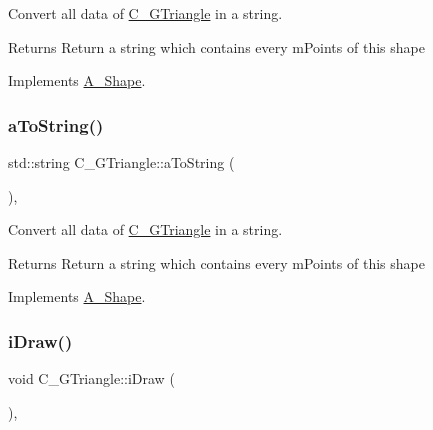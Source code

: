 Convert all data of \hyperlink{classC__GTriangle}{C\+\_\+\+G\+Triangle} in a string. 

\begin{DoxyReturn}{Returns}
Return a string which contains every m\+Points of this shape 
\end{DoxyReturn}


Implements \hyperlink{classA__Shape_ad8804b4e74543db374af6892367b7c2e}{A\+\_\+\+Shape}.

\mbox{\label{classC__GTriangle_aa432e8b8320db8a53ef1d59b486ed7ce}} 
\subsubsection{\texorpdfstring{a\+To\+String()}{aToString()}\hspace{0.1cm}{\footnotesize\ttfamily [2/2]}}
{\footnotesize\ttfamily std\+::string C\+\_\+\+G\+Triangle\+::a\+To\+String (\begin{DoxyParamCaption}{ }\end{DoxyParamCaption})\hspace{0.3cm}{\ttfamily [override]}, {\ttfamily [virtual]}}



Convert all data of \hyperlink{classC__GTriangle}{C\+\_\+\+G\+Triangle} in a string. 

\begin{DoxyReturn}{Returns}
Return a string which contains every m\+Points of this shape 
\end{DoxyReturn}


Implements \hyperlink{classA__Shape_ad8804b4e74543db374af6892367b7c2e}{A\+\_\+\+Shape}.

\mbox{\label{classC__GTriangle_a53abbd8cd622323fc2f3b80ce91cfde9}} 
\subsubsection{\texorpdfstring{i\+Draw()}{iDraw()}\hspace{0.1cm}{\footnotesize\ttfamily [1/4]}}
{\footnotesize\ttfamily void C\+\_\+\+G\+Triangle\+::i\+Draw (\begin{DoxyParamCaption}{ }\end{DoxyParamCaption})\hspace{0.3cm}{\ttfamily [override]}, {\ttfamily [virtual]}}



